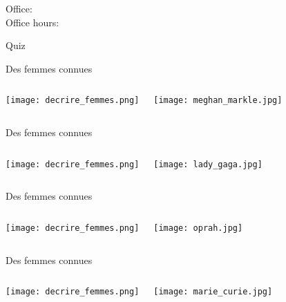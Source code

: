 \documentclass{beamer}
\subtitle[Femmes et questions]{Les femmes et les questions}
\begin{document}
  \begin{frame}
    \titlepage
    \tiny{Office: \\
          Office hours: }
  \end{frame}

  \begin{frame}{}
    \begin{center}
      \Large Quiz
    \end{center}
  \end{frame}

  \begin{frame}{Des femmes connues}
    \begin{columns}
        \texttt{[image: decrire\_femmes.png]}
        \begin{minipage}[t][0.6\textheight]{\linewidth}
          \texttt{[image: meghan\_markle.jpg]}
        \end{minipage}
    \end{columns}
  \end{frame}

  \begin{frame}{Des femmes connues}
    \begin{columns}
        \texttt{[image: decrire\_femmes.png]}
        \begin{minipage}[t][0.6\textheight]{\linewidth}
          \texttt{[image: lady\_gaga.jpg]}
        \end{minipage}
    \end{columns}
  \end{frame}

  \begin{frame}{Des femmes connues}
    \begin{columns}
        \texttt{[image: decrire\_femmes.png]}
        \begin{minipage}[t][0.6\textheight]{\linewidth}
          \texttt{[image: oprah.jpg]}
        \end{minipage}
    \end{columns}
  \end{frame}

  \begin{frame}{Des femmes connues}
    \begin{columns}
        \texttt{[image: decrire\_femmes.png]}
        \begin{minipage}[t][0.6\textheight]{\linewidth}
          \texttt{[image: marie\_curie.jpg]}
        \end{minipage}
    \end{columns}
  \end{frame}
\end{document}
